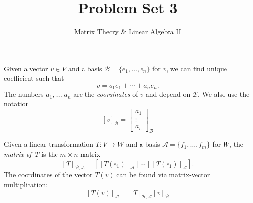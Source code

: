 \documentclass[a4paper,11pt]{article}
\title{Problem Set 3}
\author{Matrix Theory \& Linear Algebra II}
\date{}
\theoremstyle{definition}
\begin{document}
\maketitle
\thispagestyle{empty}

\noindent
Given a vector $v\in V$ and a basis $\mathcal B=\{e_1,\dots,e_n\}$ for $v$, we can find unique coefficient such that
\begin{equation}
v=a_1e_1+\cdots+a_ne_n.
\end{equation}
The numbers $a_1,\dots, a_n$ are the \textit{coordinates} of $v$ and depend on $\mathcal B$.
We also use the notation
\[
[v]_\mathcal B = \begin{bmatrix}
    a_1 \\ \vdots \\ a_n 
\end{bmatrix}_\mathcal B
\]

Given a linear transformation $T:V\to W$ and a basis $\mathcal A = \{f_1,\dots, f_m\}$ for $W$, the \textit{matrix of T} is the $m\times n$ matrix
\[
[T]_{\mathcal B,\mathcal A}
=
[[T(e_1)]_\mathcal A \mid \cdots \mid [T(e_1)]_\mathcal A ].
\]
The coordinates of the vector $T(v)$ can be found via matrix-vector multiplication:
\[
[T(v)]_\mathcal A
=
[T]_{\mathcal B,\mathcal A}[v]_\mathcal B
\]

\hrulefill 
\end{document}
